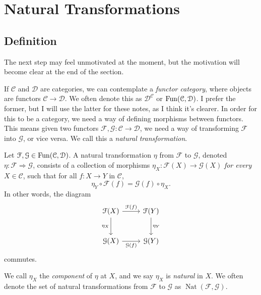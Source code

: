 \section{Natural Transformations}

\subsection{Definition}

The next step may feel unmotivated at the moment, but the motivation will become clear at the end of the section.

If $\mathcal{C} $ and $\mathcal{D} $ are categories, we can contemplate a \emph{functor category}, where objects are functors $\mathcal{C} \to \mathcal{D} $. We often denote this as $\mathcal{D} ^{\mathcal{C} } $ or $\operatorname{Fun}(\mathcal{C} ,\mathcal{D} )$. I prefer the former, but I will use the latter for these notes, as I think it's clearer. In order for this to be a category, we need a way of defining morphisms between functors. This means given two functors $\mathcal{F},\mathcal{G} : \mathcal{C}  \to \mathcal{D}  $, we need a way of transforming $\mathcal{F} $ into $\mathcal{G} $, or vice versa. We call this a \emph{natural transformation}.

\begin{definition}\label{dfn:3}
	Let $\mathcal{F} ,\mathcal{G} \in \operatorname{Fun}(\mathcal{C} ,\mathcal{D} )$. A natural transformation $\eta $ from $\mathcal{F} $ to $\mathcal{G} $, denoted $\eta : \mathcal{F}  \Rightarrow \mathcal{G} $, consists of a collection of morphisms $\eta _X : \mathcal{F} (X) \to \mathcal{G} (X)$ \emph{for every} $X\in \mathcal{C} $, such that for all $f : X \to Y$ in $\mathcal{C} $,
	\[
		\eta _Y\circ \mathcal{F} (f)=\mathcal{G} (f)\circ \eta _X
	.\]
	In other words, the diagram
	\[\begin{tikzcd}[row sep = 2.5em, column sep = 2.5em]
		\mathcal{F} (X)\ar[r, "\mathcal{F} (f)"]\ar[d, "\eta_X"']&\mathcal{F} (Y)\ar[d, "\eta _Y"]\\
		\mathcal{G} (X)\ar[r, "\mathcal{G} (f)"']&\mathcal{G} (Y)
	\end{tikzcd}\]
	commutes.
\end{definition}

We call $\eta _X$ the \emph{component} of $\eta $ at $X$, and we say $\eta _X$ is \emph{natural} in $X$. We often denote the set of natural transformations from $\mathcal{F} $ to $\mathcal{G} $ as $\operatorname{Nat} (\mathcal{F} ,\mathcal{G} )$.

